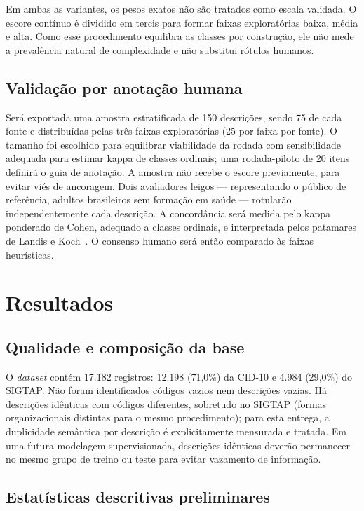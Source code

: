 \documentclass[12pt]{article}
\begin{document}
Em ambas as variantes, os pesos exatos não são tratados como escala
validada. O escore contínuo é dividido em tercis para formar faixas
exploratórias baixa, média e alta. Como esse procedimento equilibra as
classes por construção, ele não mede a prevalência natural de complexidade
e não substitui rótulos humanos.

\subsection{Validação por anotação humana}
\label{sec:validacao}

Será exportada uma amostra estratificada de 150 descrições, sendo 75 de cada
fonte e distribuídas pelas três faixas exploratórias (25 por faixa por fonte).
O tamanho foi escolhido para equilibrar viabilidade da rodada com sensibilidade
adequada para estimar kappa de classes ordinais; uma rodada-piloto de 20 itens
definirá o guia de anotação. A amostra não recebe o escore previamente, para
evitar viés de ancoragem. Dois avaliadores leigos --- representando o público
de referência, adultos brasileiros sem formação em saúde --- rotularão
independentemente cada descrição. A concordância será medida pelo
kappa ponderado de Cohen, adequado a classes ordinais, e interpretada pelos
patamares de Landis e Koch~\cite{landis1977}. O consenso humano será então
comparado às faixas heurísticas.

\section{Resultados}
\label{sec:resultados}

\subsection{Qualidade e composição da base}

O \textit{dataset} contém 17.182 registros: 12.198 (71{,}0\%) da CID-10 e
4.984 (29{,}0\%) do SIGTAP. Não foram identificados códigos vazios nem
descrições vazias. Há descrições idênticas com códigos diferentes,
sobretudo no SIGTAP (formas organizacionais distintas para o mesmo
procedimento); para esta entrega, a duplicidade semântica por descrição é
explicitamente mensurada e tratada. Em uma futura modelagem supervisionada,
descrições idênticas deverão permanecer no mesmo grupo de treino ou teste
para evitar vazamento de informação.

\subsection{Estatísticas descritivas preliminares}
\label{sec:descritivos}
\end{document}
